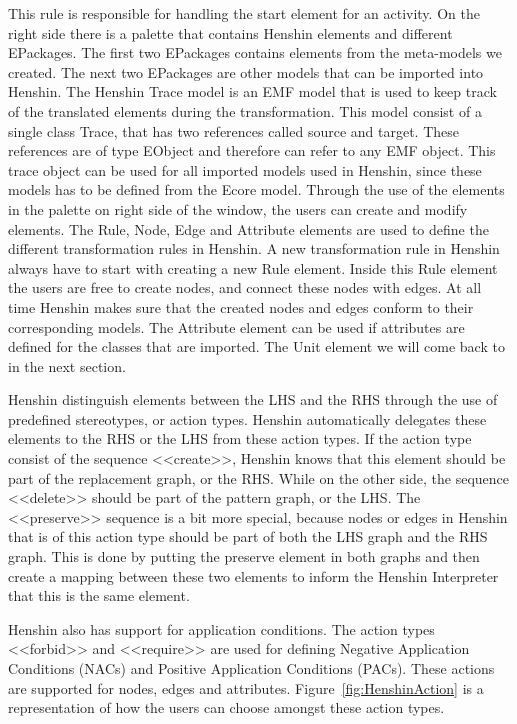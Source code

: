 This rule is responsible for handling the start element for an activity.
On the right side there is a palette that contains Henshin elements and
different EPackages. The first two EPackages contains elements from the
meta-models we created. The next two EPackages are other models that can
be imported into Henshin. The Henshin Trace model is an EMF model that is used
to keep track of the translated elements during the transformation. This model
consist of a single class Trace, that has two references called source and
target. These references are of type EObject and therefore can refer to any EMF
object. This trace object can be used for all imported models used
in Henshin, since these models has to be defined from the Ecore model. Through
the use of the elements in the palette on right side of the window, the users
can create and modify elements. 
The Rule, Node, Edge and Attribute elements are used to define the different
transformation rules in Henshin. A new transformation rule in Henshin always
have to start with creating a new Rule element. Inside this Rule element the
users are free to create nodes, and connect these nodes with edges. At
all time Henshin makes sure that the created nodes and edges conform to their
corresponding models. The Attribute element can be used if attributes are
defined for the classes that are imported. The Unit element we will come back to
in the next section.

Henshin distinguish elements between the LHS and the RHS through the
use of predefined stereotypes, or action types. Henshin automatically delegates
these elements to the RHS or the LHS from these action types. If the action type
consist of the sequence <<create>>, Henshin knows that this element should be
part of the replacement graph, or the RHS. While on the other side, the sequence
<<delete>> should be part of the pattern graph, or the LHS. The <<preserve>>
sequence is a bit more special, because nodes or edges in Henshin that is of
this action type should be part of both the LHS graph and the RHS graph. This is
done by putting the preserve element in both graphs and then create a mapping
between these two elements to inform the Henshin Interpreter that this is the
same element.

Henshin also has support for application conditions. The action types <<forbid>>
and <<require>> are used for defining Negative Application Conditions (NACs)
and Positive Application Conditions (PACs). These actions are supported for
nodes, edges and attributes. Figure~\ref{fig:HenshinAction} is a representation
of how the users can choose amongst these action types.  

